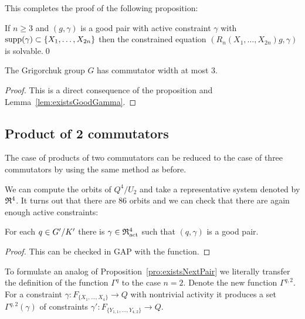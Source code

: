 \documentclass[a4paper,11pt]{amsart}
\begin{document}
This completes the proof of the following proposition:
\begin{pro}\label{pro:solvableConstraintedEquations}
 If $n\geq3$ and $(g,\gamma)$ is a good pair with active constraint $\gamma$ with $\operatorname{{supp}}(\gamma)\subset\{X_1,\dotsc,X_{2n}\}$
 then the constrained equation $(R_n(X_1,\dotsc,X_{2n})g,\gamma)$ is solvable.\qed
\end{pro}
\begin{cor}
 The Grigorchuk group $G$ has commutator width at most $3$.
\end{cor}
\begin{proof}
 This is a direct consequence of the proposition and Lemma~\ref{lem:existsGoodGamma}.
\end{proof}

\subsection{Product of 2 commutators}
The case of products of two commutators can be reduced to the case of three 
commutators by using the same method as before.

We can compute the orbits of $Q^4/U_2$ and take a representative system 
denoted by $\mathfrak{R}^4$.
It turns out that there are $86$ orbits and we can check that there are again enough active constraints:
\begin{lem} \label{lem:existsGoodGammaForRed4}
 For each $q\in{G'/K'}$ there is $\gamma\in \mathfrak{R}^4_{\operatorname{act}}$ such that $(q,\gamma)$ is a 
 good pair.
\end{lem}
\begin{proof}
 This can be checked in GAP with the function\newline {}.
\end{proof}

  To formulate an analog of Proposition~\ref{pro:existsNextPair} we literally transfer the definition 
  of the function $\Gamma^{q}$ to the case $n=2$. Denote the new function $\Gamma^{q,2}$.
  For a constraint $\gamma\colon F_{\{X_1,\ldots,X_4\}} \to Q$ with nontrivial
  activity it produces
  a set $\Gamma^{q,2}(\gamma)$ of constraints $\gamma'\colon F_{\{Y_
  {1,1},\ldots,Y_{4,2}\}}\to Q$.
\end{document}
